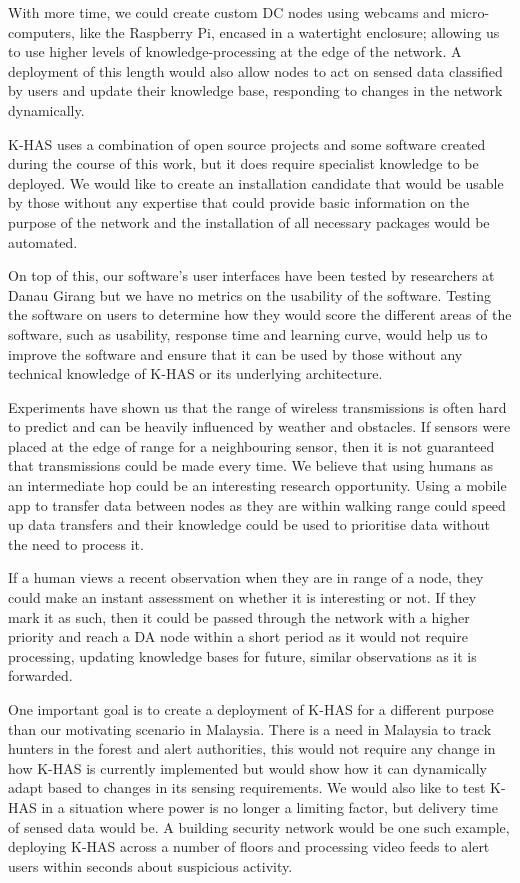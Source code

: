 With more time, we could create custom DC nodes using webcams and micro-computers, like the Raspberry Pi, encased in a watertight enclosure; allowing us to use higher levels of knowledge-processing at the edge of the network. A deployment of this length would also allow nodes to act on sensed data classified by users and update their knowledge base, responding to changes in the network dynamically.

K-HAS uses a combination of open source projects and some software created during the course of this work, but it does require specialist knowledge to be deployed. We would like to create an installation candidate that would be usable by those without any expertise that could provide basic information on the purpose of the network and the installation of all necessary packages would be automated.

On top of this, our software's user interfaces have been tested by researchers at Danau Girang but we have no metrics on the usability of the software. Testing the software on users to determine how they would score the different areas of the software, such as usability, response time and learning curve, would help us to improve the software and ensure that it can be used by those without any technical knowledge of K-HAS or its underlying architecture.

Experiments have shown us that the range of wireless transmissions is often hard to predict and can be heavily influenced by weather and obstacles. If sensors were placed at the edge of range for a neighbouring sensor, then it is not guaranteed that transmissions could be made every time. We believe that using humans as an intermediate hop could be an interesting research opportunity. Using a mobile app to transfer data between nodes as they are within walking range could speed up data transfers and their knowledge could be used to prioritise data without the need to process it.

If a human views a recent observation when they are in range of a node, they could make an instant assessment on whether it is interesting or not. If they mark it as such, then it could be passed through the network with a higher priority and reach a DA node within a short period as it would not require processing, updating knowledge bases for future, similar observations as it is forwarded.

One important goal is to create a deployment of K-HAS for a different purpose than our motivating scenario in Malaysia. There is a need in Malaysia to track hunters in the forest and alert authorities, this would not require any change in how K-HAS is currently implemented but would show how it can dynamically adapt based to changes in its sensing requirements. We would also like to test K-HAS in a situation where power is no longer a limiting factor, but delivery time of sensed data would be. A building security network would be one such example, deploying K-HAS across a number of floors and processing video feeds to alert users within seconds about suspicious activity.

